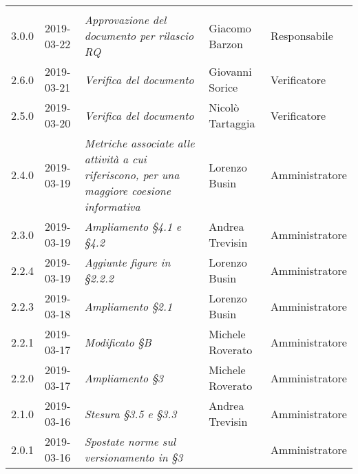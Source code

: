\newpage 
\section*{}
	\begin{longtable}{C{2cm}|C{2.5cm}|C{4.5cm}|C{2.5cm}|C{3cm}}

		 &  &  &  &   \\
		\endhead
		
		3.0.0 & 2019-03-22 & \emph{Approvazione del documento per rilascio RQ} & Giacomo Barzon & Responsabile \\
		\hline
		
		2.6.0 & 2019-03-21 & \emph{Verifica del documento}  & Giovanni Sorice & Verificatore  \\
		\hline
		
		2.5.0 & 2019-03-20 & \emph{Verifica del documento} & Nicolò Tartaggia & Verificatore  \\
		\hline
		
		2.4.0 & 2019-03-19 & \emph{Metriche associate alle attività a cui riferiscono, per una maggiore coesione informativa } & Lorenzo Busin & Amministratore \\
		\hline
		
		2.3.0 & 2019-03-19 & \emph{Ampliamento §4.1 e §4.2} & Andrea Trevisin & Amministratore \\
		\hline
		
		2.2.4 & 2019-03-19 & \emph{Aggiunte figure in §2.2.2} & Lorenzo Busin & Amministratore \\
		\hline
		
		2.2.3 & 2019-03-18 & \emph{Ampliamento §2.1} & Lorenzo Busin & Amministratore \\
		\hline
		
		2.2.1 & 2019-03-17 & \emph{Modificato §B} & Michele Roverato & Amministratore \\
		\hline
		
		2.2.0 & 2019-03-17 & \emph{Ampliamento §3} & Michele Roverato & Amministratore \\
		\hline
		
		2.1.0 & 2019-03-16 & \emph{Stesura §3.5 e §3.3} & Andrea Trevisin & Amministratore \\
		\hline
		
		2.0.1 & 2019-03-16 & \emph{Spostate norme sul versionamento in §3} &  & Amministratore \\
		\hline
		

\end{longtable}
